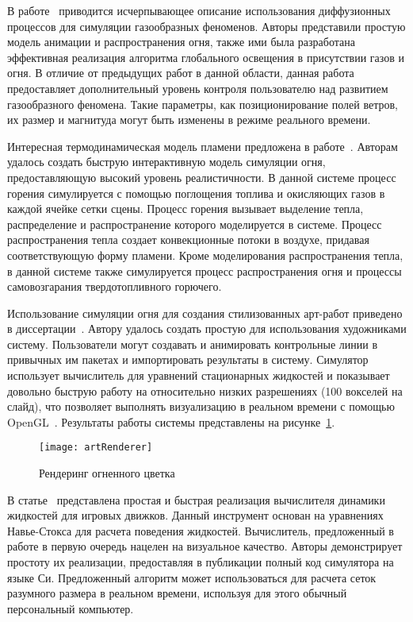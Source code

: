 В работе~\cite{DiffusionProcesses} приводится исчерпывающее описание
использования диффузионных процессов для симуляции газообразных феноменов.
Авторы представили простую модель анимации и распространения огня, также ими
была разработана эффективная реализация алгоритма глобального освещения в
присутствии газов и огня. В отличие от предыдущих работ в данной области, данная
работа предоставляет дополнительный уровень контроля пользователю над развитием
газообразного феномена. Такие параметры, как позиционирование полей ветров, их
размер и магнитуда могут быть изменены в режиме реального времени.

Интересная термодинамическая модель пламени предложена
в работе\break{}~\cite{InteractiveSimulation}. Авторам удалось создать быструю интерактивную
модель симуляции огня, предоставляющую высокий уровень реалистичности. В данной
системе процесс горения симулируется с помощью поглощения топлива и окисляющих
газов в каждой ячейке сетки сцены. Процесс горения вызывает выделение тепла,
распределение и распространение которого моделируется в системе. Процесс
распространения тепла создает конвекционные потоки в воздухе, придавая
соответствующую форму пламени. Кроме моделирования распространения тепла, в
данной системе также симулируется процесс распространения огня и процессы
самовозгарания твердотопливного горючего.

Использование симуляции огня для создания стилизованных арт-работ приведено в
диссертации~\cite{Bangalore2012ATF}. Автору удалось создать простую для
использования художниками систему. Пользователи могут создавать и анимировать
контрольные линии в привычных им пакетах и импортировать результаты в систему.
Симулятор использует вычислитель для уравнений стационарных жидкостей и
показывает довольно быструю работу на относительно низких разрешениях (100
вокселей на слайд), что позволяет выполнять визуализацию в реальном времени с
помощью OpenGL~\@. Результаты работы системы представлены на
рисунке~\ref{fig:artRenderer}.
\begin{figure}[htb]
	\centering
    \texttt{[image: artRenderer]}
    \caption{Рендеринг огненного цветка}%
    \label{fig:artRenderer}
\end{figure}

В статье~\cite{ForGames} представлена простая и быстрая
реализация вычислителя динамики жидкостей для игровых движков. Данный инструмент
основан на уравнениях Навье-Стокса для расчета поведения жидкостей. Вычислитель,
предложенный в работе в первую очередь нацелен на визуальное качество. Авторы
демонстрирует простоту их реализации, предоставляя в публикации полный код
симулятора на языке Си. Предложенный алгоритм может использоваться для расчета
сеток разумного размера в реальном времени, используя для этого обычный
персональный компьютер.

